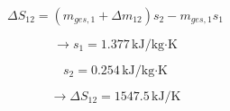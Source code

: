 \[
\Delta S_{12} = (m_{ges,1} + \Delta m_{12}) s_2 - m_{ges,1} s_1
\]  

\[
\rightarrow s_1 = 1.377 \, \text{kJ/kg·K}
\]  

\[
s_2 = 0.254 \, \text{kJ/kg·K}
\]  

\[
\rightarrow \Delta S_{12} = 1547.5 \, \text{kJ/K}
\]